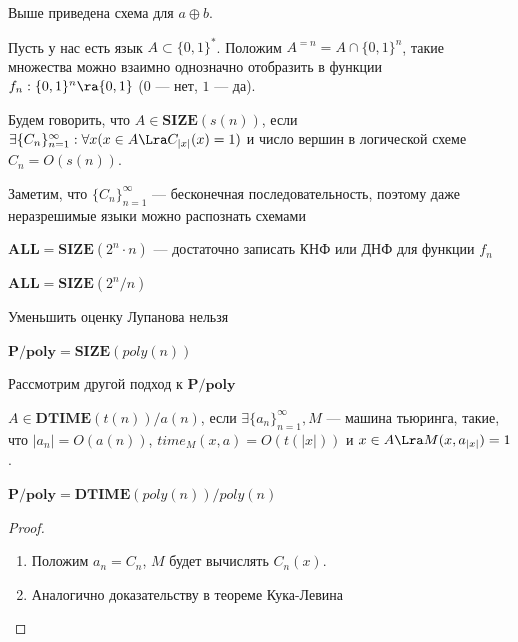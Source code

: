 Выше приведена схема для \(a \oplus b\). 

Пусть у нас есть язык \(A \subset \{0, 1\}^*\). Положим \(A^{=n} = A \cap \{0, 1\}^n\), такие множества можно взаимно однозначно отобразить в функции \(f_n: \{0, 1\}^n \ra \{0, 1\}\) (\(0\) --- нет, \(1\) --- да). 

\begin{definition}
    Будем говорить, что \(A \in \mathbf{SIZE}(s(n))\), если \(\exists \{C_n\}_{n = 1}^\infty: \forall x (x \in A \Lra C_{|x|}(x) = 1)\) и число вершин в логической схеме \(C_n = O(s(n))\). 
\end{definition}

\begin{note}
    Заметим, что \(\{C_n\}_{n = 1}^\infty\) --- бесконечная последовательность, поэтому даже неразрешимые языки можно распознать схемами
\end{note}

\begin{note}
    \(\mathbf{ALL} = \mathbf{SIZE}(2^n\cdot n)\) --- достаточно записать КНФ или ДНФ для функции \(f_n\)
\end{note}

\begin{theorem}[Лупанов]
    \(\mathbf{ALL} = \mathbf{SIZE}(2^n / n)\) 
\end{theorem}

\begin{theorem}[Шеннон]
    Уменьшить оценку Лупанова нельзя
\end{theorem}

\begin{definition}
    \(\mathbf{P/poly} = \mathbf{SIZE}(poly(n))\)
\end{definition}

Рассмотрим другой подход к \(\mathbf{P/poly}\)

\begin{definition}
    \(A \in \mathbf{DTIME}(t(n))/a(n)\), если \(\exists \{a_n\}_{n = 1}^\infty, M\) --- машина тьюринга, такие, что \(|a_n| = O(a(n))\), \(time_M(x, a) = O(t(|x|))\) и \(x \in A \Lra M(x, a_{|x|}) = 1\).
\end{definition}

\begin{theorem}
    \(\mathbf{P/poly} = \mathbf{DTIME}(poly(n))/poly(n)\)
\end{theorem}
\begin{proof}
    \begin{enumerate}
        \item[\(\subset\)] Положим \(a_n = C_n\), \(M\) будет вычислять \(C_n(x)\).
        \item[\(\supset\)] Аналогично доказательству в теореме Кука-Левина
    \end{enumerate}
\end{proof}

